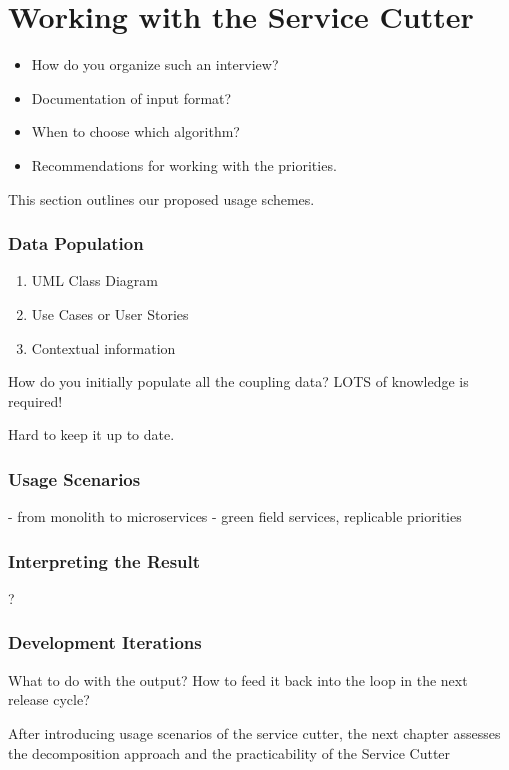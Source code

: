 \chapter{Working with the Service Cutter} 

\begin{itemize}
	\item How do you organize such an interview?
	\item Documentation of input format?
	\item When to choose which algorithm?
	\item Recommendations for working with the priorities.
\end{itemize}

This section outlines our proposed usage schemes.

\subsection{Data Population}

\begin{enumerate}
	\item UML Class Diagram
	\item Use Cases or User Stories
	\item Contextual information
\end{enumerate}

How do you initially populate all the coupling data? LOTS of knowledge is required!

Hard to keep it up to date.

\subsection{Usage Scenarios}

- from monolith to microservices
- green field services, replicable priorities

\subsection{Interpreting the Result}

?
\subsection{Development Iterations}

What to do with the output? How to feed it back into the loop in the next release cycle?


After introducing usage scenarios of the service cutter, the next chapter assesses the decomposition approach and the practicability of the Service Cutter